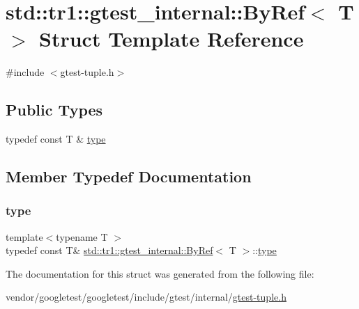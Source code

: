 \hypertarget{structstd_1_1tr1_1_1gtest__internal_1_1_by_ref}{}\section{std\+:\+:tr1\+:\+:gtest\+\_\+internal\+:\+:By\+Ref$<$ T $>$ Struct Template Reference}
\label{structstd_1_1tr1_1_1gtest__internal_1_1_by_ref}


{\ttfamily \#include $<$gtest-\/tuple.\+h$>$}

\subsection*{Public Types}
\begin{DoxyCompactItemize}
\item 
typedef const T \& \hyperlink{structstd_1_1tr1_1_1gtest__internal_1_1_by_ref_ac42ad942ee1cfa86b2abcce9b88ac10e}{type}
\end{DoxyCompactItemize}


\subsection{Member Typedef Documentation}
\mbox{\label{structstd_1_1tr1_1_1gtest__internal_1_1_by_ref_ac42ad942ee1cfa86b2abcce9b88ac10e}} 
\subsubsection{\texorpdfstring{type}{type}}
{\footnotesize\ttfamily template$<$typename T $>$ \\
typedef const T\& \hyperlink{structstd_1_1tr1_1_1gtest__internal_1_1_by_ref}{std\+::tr1\+::gtest\+\_\+internal\+::\+By\+Ref}$<$ T $>$\+::\hyperlink{structstd_1_1tr1_1_1gtest__internal_1_1_by_ref_ac42ad942ee1cfa86b2abcce9b88ac10e}{type}}



The documentation for this struct was generated from the following file\+:\begin{DoxyCompactItemize}
\item 
vendor/googletest/googletest/include/gtest/internal/\hyperlink{gtest-tuple_8h}{gtest-\/tuple.\+h}\end{DoxyCompactItemize}
